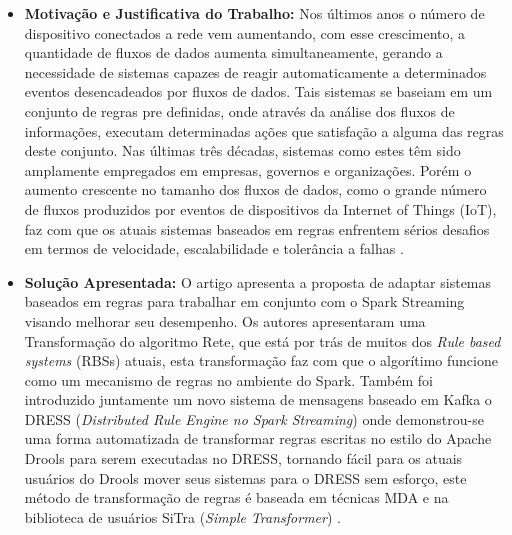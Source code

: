 \documentclass[tid,table]{texufpel} %
\begin{document}
\begin{itemize}
	\item \textbf{Motivação e Justificativa do Trabalho:} Nos últimos anos o número de dispositivo conectados a rede vem aumentando, com esse crescimento, a quantidade de fluxos de dados aumenta simultaneamente, gerando a necessidade de sistemas capazes de reagir automaticamente a determinados eventos desencadeados por fluxos de dados. Tais sistemas se baseiam em um conjunto de regras pre definidas, onde através da análise dos fluxos de informações, executam determinadas ações que satisfação a alguma das regras deste conjunto. Nas últimas três décadas, sistemas como estes têm sido amplamente empregados em empresas, governos e organizações. Porém o aumento crescente no tamanho dos fluxos de dados, como o grande número de fluxos produzidos por eventos de dispositivos da Internet of Things (IoT), faz com que os atuais sistemas baseados em regras enfrentem sérios desafios em termos de velocidade, escalabilidade e tolerância a falhas \cite{art5chen2016dress}.
	
	\item \textbf{Solução Apresentada:} O artigo apresenta a proposta de adaptar sistemas baseados em regras para trabalhar em conjunto com o Spark Streaming visando melhorar seu desempenho. Os autores apresentaram uma Transformação do algoritmo Rete, que está por trás de muitos dos \textit{Rule based systems} (RBSs) atuais, esta transformação faz com que o algorítimo funcione como um mecanismo de regras no ambiente do Spark. Também foi introduzido juntamente um novo sistema de mensagens baseado em Kafka o DRESS (\textit{Distributed Rule Engine no Spark Streaming}) onde demonstrou-se uma forma automatizada de transformar regras escritas no estilo do Apache Drools para serem executadas no DRESS, tornando fácil para os atuais usuários do Drools mover seus sistemas para o DRESS sem esforço, este método de transformação de regras é baseada em técnicas MDA e na biblioteca de usuários SiTra (\textit{Simple Transformer}) \cite{art5chen2016dress}.
	

\end{itemize}
\end{document}
